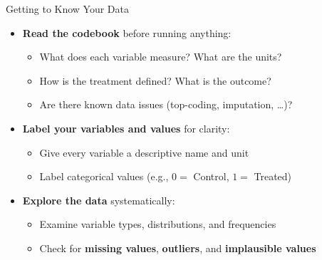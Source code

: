 \documentclass[dvipsnames,hyperref={pdfpagelabels=false}]{beamer}
\begin{document}
\begin{frame}{Getting to Know Your Data}{}
\begin{itemize}
    \item \textbf{Read the codebook} before running anything:
    \vspace{0.1cm}
    \begin{itemize}
        \item What does each variable measure? What are the units?
        \vspace{0.1cm}
        \item How is the treatment defined? What is the outcome?
        \vspace{0.1cm}
        \item Are there known data issues (top-coding, imputation, \ldots)?
    \end{itemize}
    \vspace{0.2cm}
    \item \textbf{Label your variables and values} for clarity:
    \vspace{0.1cm}
    \begin{itemize}
        \item Give every variable a descriptive name and unit
        \vspace{0.1cm}
        \item Label categorical values (e.g., $0 =$ Control, $1 =$ Treated)
    \end{itemize}
    \vspace{0.2cm}
    \item \textbf{Explore the data} systematically:
    \vspace{0.1cm}
    \begin{itemize}
        \item Examine variable types, distributions, and frequencies
        \vspace{0.1cm}
        \item Check for \textbf{missing values}, \textbf{outliers},
        and \textbf{implausible values}
    \end{itemize}
\end{itemize}
\end{frame}
\end{document}
